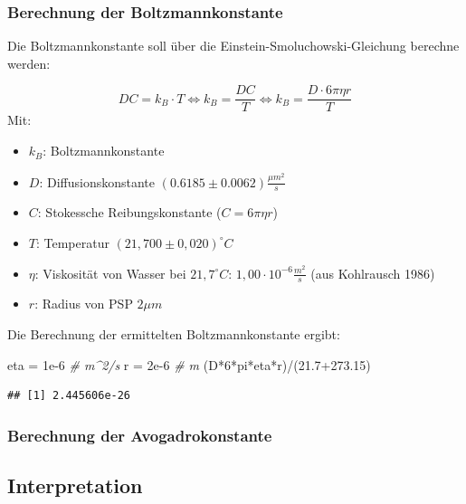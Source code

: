 \documentclass[
  9pt,
]{article}
\newenvironment{Shaded}{\begin{snugshade}}{\end{snugshade}}
\newcommand{\CommentTok}[1]{\textcolor[rgb]{0.56,0.35,0.01}{\textit{#1}}}
\newcommand{\DecValTok}[1]{\textcolor[rgb]{0.00,0.00,0.81}{#1}}
\newcommand{\FloatTok}[1]{\textcolor[rgb]{0.00,0.00,0.81}{#1}}
\newcommand{\NormalTok}[1]{#1}
\newcommand{\OtherTok}[1]{\textcolor[rgb]{0.56,0.35,0.01}{#1}}
\newcommand{\SpecialCharTok}[1]{\textcolor[rgb]{0.00,0.00,0.00}{#1}}
\begin{document}
\hypertarget{berechnung-der-boltzmannkonstante}{%
\subsubsection{Berechnung der
Boltzmannkonstante}\label{berechnung-der-boltzmannkonstante}}

Die Boltzmannkonstante soll über die Einstein-Smoluchowski-Gleichung
berechne werden:

\[DC = k_B\cdot T \Leftrightarrow k_B = \frac{DC}{T} \Leftrightarrow k_B = \frac{D\cdot 6\pi \eta r}{T}\]
Mit:

\begin{itemize}
  \item $k_B$: Boltzmannkonstante
  \item $D$: Diffusionskonstante $(0.6185 \pm 0.0062 )\frac{\mu m^2}{s}$
  \item $C$: Stokessche Reibungskonstante ($C=6\pi \eta r$)
  \item $T$: Temperatur $(21,700 \pm 0,020)^{\circ}C$
  \item $\eta$: Viskosität von Wasser bei $21,7^{\circ}C$: $1,00\cdot 10^{-6}\frac{m^2}{s}$ (aus Kohlrausch 1986)
  \item $r$: Radius von PSP $2\mu m$
\end{itemize}

Die Berechnung der ermittelten Boltzmannkonstante ergibt:

\begin{Shaded}
\begin{Highlighting}[]
\NormalTok{eta }\OtherTok{=} \FloatTok{1e{-}6} \CommentTok{\# m\^{}2/s}
\NormalTok{r }\OtherTok{=} \FloatTok{2e{-}6} \CommentTok{\# m }
\NormalTok{(D}\SpecialCharTok{*}\DecValTok{6}\SpecialCharTok{*}\NormalTok{pi}\SpecialCharTok{*}\NormalTok{eta}\SpecialCharTok{*}\NormalTok{r)}\SpecialCharTok{/}\NormalTok{(}\FloatTok{21.7+273.15}\NormalTok{)}
\end{Highlighting}
\end{Shaded}

\begin{verbatim}
## [1] 2.445606e-26
\end{verbatim}

\hypertarget{berechnung-der-avogadrokonstante}{%
\subsubsection{Berechnung der
Avogadrokonstante}\label{berechnung-der-avogadrokonstante}}

\hypertarget{interpretation}{%
\subsection{Interpretation}\label{interpretation}}
\end{document}
